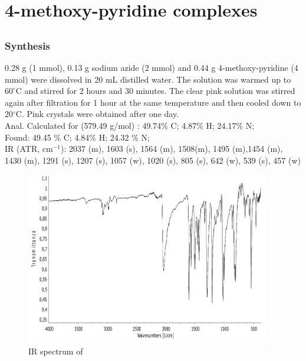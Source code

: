 \chapter{4-methoxy-pyridine complexes}
\section{\ce{[Co(N_3)_2(4-methoxypyridine)_4]}}
\label{CoA4MOP}
\subsection{Synthesis}
0.28 g  (1 mmol), 0.13 g sodium azide (2 mmol) and 0.44 g 4-methoxy-pyridine (4 mmol) were dissolved in 20 mL distilled water. The solution was warmed up to $60^\circ$C  and stirred for 2 hours and 30 minutes. The clear pink solution was stirred again after filtration for 1 hour at the same temperature and then cooled down to 20$^\circ$C. Pink crystals were obtained after one day.\\ Anal. Calculated for  (579.49 g/mol) : 49.74\% C; 4.87\% H; 24.17\% N;\\
Found: 49.45 \% C; 4.84\% H; 24.32 \% N;\\
IR (ATR, cm$^{-1}$): 2037 (m), 1603 (s), 1564 (m), 1508(m), 1495 (m),1454 (m), 1430 (m), 1291 (s), 1207 (s), 1057 (w), 1020 (s), 805 (s), 642 (w), 539 (s), 457 (w)

\begin{figure}[h!]
\centering
\includegraphics[scale=0.5, width=0.95\textwidth]{figures/CoA4MOP-IR.pdf}
\caption{IR spectrum of \ce{[Co(N_3)_2(4-MeOpy)_4]}}
\end{figure}

